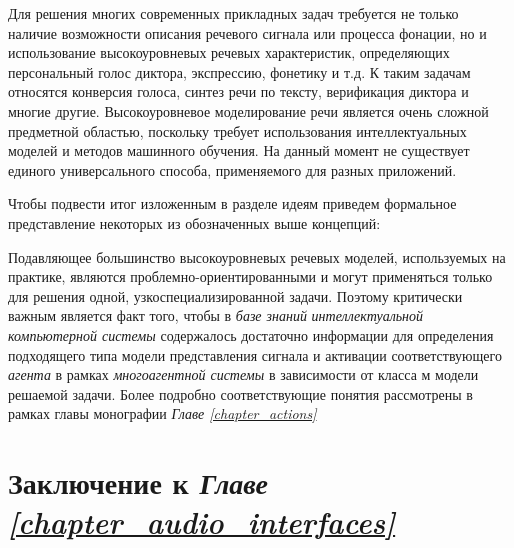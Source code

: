 Для решения многих современных прикладных задач требуется не только наличие возможности описания речевого сигнала или процесса фонации, но и использование высокоуровневых речевых характеристик, определяющих персональный голос диктора, экспрессию, фонетику и т.д. К таким задачам относятся конверсия голоса, синтез речи по тексту, верификация диктора и многие другие. Высокоуровневое моделирование речи является очень сложной предметной областью, поскольку требует использования интеллектуальных моделей и методов машинного обучения. На данный момент не существует единого универсального способа, применяемого для разных приложений.

Чтобы подвести итог изложенным в разделе идеям приведем формальное представление некоторых из обозначенных выше концепций:

\begin{SCn}
\begin{scnindent}
\end{scnindent}
\end{SCn}

Подавляющее большинство высокоуровневых речевых моделей, используемых на практике, являются проблемно-ориентированными и могут применяться только для решения одной, узкоспециализированной задачи. Поэтому критически важным является факт того, чтобы в \textit{базе знаний} \textit{интеллектуальной компьютерной системы} содержалось достаточно информации для определения подходящего типа модели представления сигнала и активации соответствующего \textit{агента} в рамках \textit{многоагентной системы} в зависимости от класса м модели решаемой задачи. Более подробно соответствующие понятия рассмотрены в рамках главы монографии \textit{Главе \ref{chapter_actions}~}


\section*{Заключение к \textit{Главе \ref{chapter_audio_interfaces}~}}

